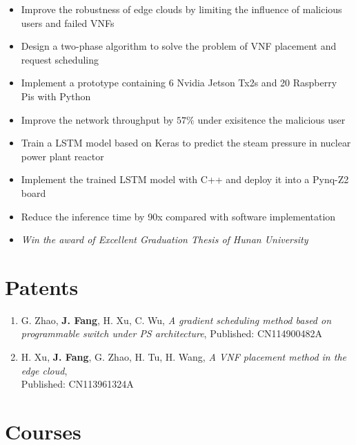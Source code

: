 \documentclass{resume}
\begin{document}
\begin{itemize}
  \item Improve the robustness of edge clouds by limiting the influence of malicious users and failed VNFs
  \item Design a two-phase algorithm to solve the problem of VNF placement and request scheduling
  \item Implement a prototype containing 6 Nvidia Jetson Tx2s and 20 Raspberry Pis with Python
  \item Improve the network throughput by $57\%$ under exisitence the malicious user
\end{itemize}

\begin{itemize}
  \item Train a LSTM model based on Keras to predict the steam pressure in nuclear power plant reactor
  \item Implement the trained LSTM model with C++ and deploy it into a Pynq-Z2 board
  \item Reduce the inference time by 90x compared with software implementation
  \item \textit{Win the award of Excellent Graduation Thesis of Hunan University}
\end{itemize}

\section{Patents}

\begin{enumerate}
  \item G. Zhao, \textbf{J. Fang}, H. Xu, C. Wu, \textit{A gradient scheduling method based on programmable switch under PS architecture}, Published: CN114900482A
  \item H. Xu, \textbf{J. Fang}, G. Zhao, H. Tu, H. Wang, \textit{A VNF placement method in the edge cloud}, \\ Published: CN113961324A
\end{enumerate}

\section{Courses}
\end{document}
